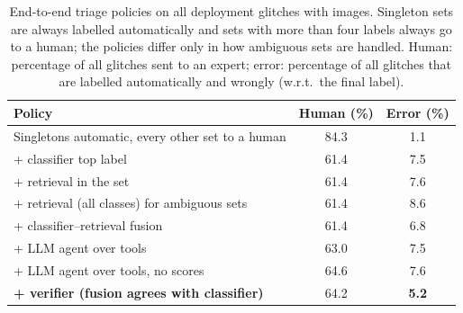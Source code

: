 \begin{table}[!htbp]
\caption{End-to-end triage policies on all deployment glitches with images. Singleton sets are always labelled automatically
and sets with more than four labels always go to a human; the policies differ only in how ambiguous sets are handled. Human:
percentage of all glitches sent to an expert; error: percentage of all glitches that are labelled automatically and wrongly
(w.r.t.\ the final label).}\label{tab:e6pol}
\centering\footnotesize\setlength{\tabcolsep}{4pt}
\begin{tabular}{lcc}\toprule
Policy & Human (\%) & Error (\%)\\\midrule
Singletons automatic, every other set to a human & 84.3 & 1.1\\
\midrule
+ classifier top label & 61.4 & 7.5\\
+ retrieval in the set & 61.4 & 7.6\\
+ retrieval (all classes) for ambiguous sets & 61.4 & 8.6\\
+ classifier--retrieval fusion & 61.4 & 6.8\\
+ LLM agent over tools & 63.0 & 7.5\\
+ LLM agent over tools, no scores & 64.6 & 7.6\\
\textbf{+ verifier (fusion agrees with classifier)} & 64.2 & \textbf{5.2}\\
\bottomrule
\end{tabular}
\end{table}
